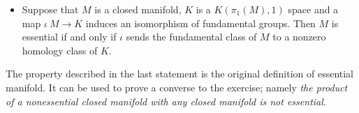 \begin{itemize}
 \item Suppose that $M$ is a closed manifold, 
$K$ is a $K(\pi_1(M),1)$ space and a map $\iota\:M\to K$ induces an isomorphism of fundamental groups.
Then $M$ is essential if and only if $\iota$ sends the fundamental class of $M$ to a nonzero homology class of $K$.
\end{itemize}

The property described in the last statement is the original definition of essential manifold.
It can be used to prove a converse to the exercise;
namely \textit{the product of a nonessential closed manifold with any closed manifold is \emph{not} essential}.



